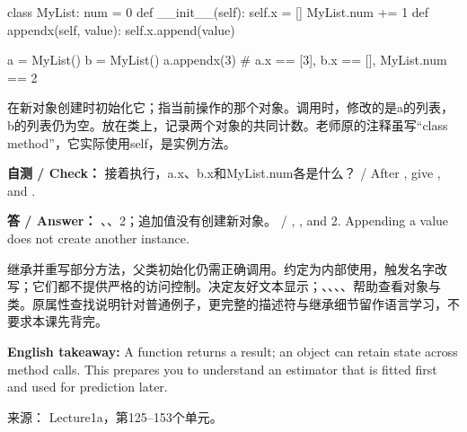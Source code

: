 \begin{StudyCode}
class MyList:
    num = 0
    def __init__(self):
        self.x = []
        MyList.num += 1
    def appendx(self, value):
        self.x.append(value)

a = MyList()
b = MyList()
a.appendx(3)
# a.x == [3], b.x == [], MyList.num == 2
\end{StudyCode}


在新对象创建时初始化它；指当前操作的那个对象。调用时，修改的是a的列表，b的列表仍为空。放在类上，记录两个对象的共同计数。老师原的注释虽写“class method”，它实际使用self，是实例方法。


\textbf{自测 / Check：} 接着执行，a.x、b.x和MyList.num各是什么？ / After , give ,  and .


\textbf{答 / Answer：} \StudyInline{[3]}、\StudyInline{[5]}、2；追加值没有创建新对象。 / \StudyInline{[3]}, \StudyInline{[5]}, and 2. Appending a value does not create another instance.


继承并重写部分方法，父类初始化仍需正确调用。约定为内部使用，触发名字改写；它们都不提供严格的访问控制。决定友好文本显示；、、、、帮助查看对象与类。原属性查找说明针对普通例子，更完整的描述符与继承细节留作语言学习，不要求本课先背完。


\textbf{English takeaway:} A function returns a result; an object can retain state across method calls. This prepares you to understand an estimator that is fitted first and used for prediction later.


来源： Lecture1a，第125–153个单元。






